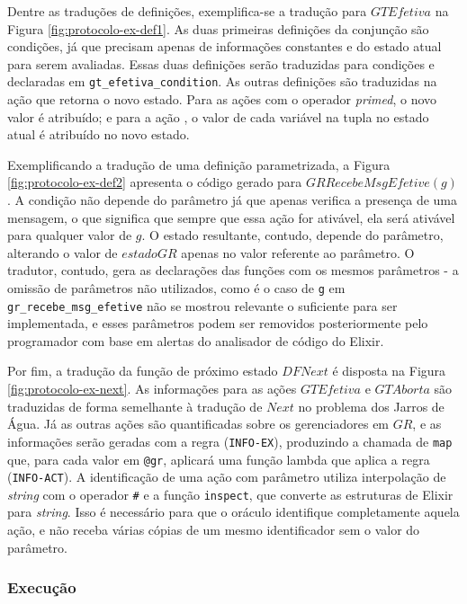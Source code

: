 Dentre as traduções de definições, exemplifica-se a tradução para
$GTEfetiva$ na Figura \ref{fig:protocolo-ex-def1}. As duas primeiras definições
da conjunção são condições, já que precisam apenas de informações constantes e
do estado atual para serem avaliadas. Essas duas definições serão traduzidas
para condições e declaradas em \texttt{gt\_efetiva\_condition}. As outras
definições são traduzidas na ação que retorna o novo estado. Para as ações com o
operador \textit{primed}, o novo valor é atribuído; e para a ação \UNCHANGED, o
valor de cada variável na tupla no estado atual é atribuído no novo estado.

Exemplificando a tradução de uma definição parametrizada, a Figura
\ref{fig:protocolo-ex-def2} apresenta o código gerado para
$GRRecebeMsgEfetive(g)$. A condição não depende do parâmetro já que apenas
verifica a presença de uma mensagem, o que significa que sempre que essa ação
for ativável, ela será ativável para qualquer valor de $g$. O estado resultante,
contudo, depende do parâmetro, alterando o valor de $estadoGR$ apenas no valor
referente ao parâmetro. O tradutor, contudo, gera as declarações das funções com
os mesmos parâmetros - a omissão de parâmetros não utilizados, como é o caso de
\texttt{g} em \texttt{gr\_recebe\_msg\_efetive} não se mostrou relevante o
suficiente para ser implementada, e esses parâmetros podem ser removidos
posteriormente pelo programador com base em alertas do analisador de código do
Elixir.

Por fim, a tradução da função de próximo estado $DFNext$ é disposta na Figura
\ref{fig:protocolo-ex-next}. As informações para as ações $GTEfetiva$ e
$GTAborta$ são traduzidas de forma semelhante à tradução de $Next$ no problema
dos Jarros de Água. Já as outras ações são quantificadas sobre os gerenciadores
em $GR$, e as informações serão geradas com a regra (\texttt{INFO-EX}),
produzindo a chamada de \texttt{map} que, para cada valor em \texttt{@gr},
aplicará uma função lambda que aplica a regra (\texttt{INFO-ACT}). A
identificação de uma ação com parâmetro utiliza interpolação de \textit{string}
com o operador \texttt{#{}} e a função \texttt{inspect}, que converte as
estruturas de Elixir para \textit{string}. Isso é necessário para que o oráculo
identifique completamente aquela ação, e não receba várias cópias de um mesmo
identificador sem o valor do parâmetro.

\subsubsection{Execução}

